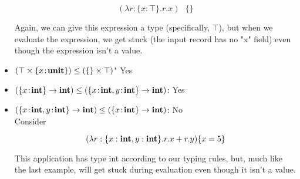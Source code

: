 \documentclass[10pt]{article}
\begin{document}
\begin{exercise}
\begin{itemize}
			$$(\lambda r:\{x:\top\}.r.x) \text{ } \{\}$$ 
			
			Again, we can give this expression a type (specifically, $\top$), but 
			when we evaluate the expression, we get stuck (the input record has no "x"
			field) even though the expression isn't a value.\\
			
\item $(\top \times \{ x \!:\! \mathsf{\textbf{unit}} \}) \leq (\{\} \times \top)$"
			Yes \\
			
			
\item $(\{ x \!:\! \mathsf{\textbf{int}} \} \rightarrow \mathsf{\textbf{int}}) \leq (\{ x \!:\! \mathsf{\textbf{int}}, y \!:\! 			\mathsf{\textbf{int}} \} \rightarrow \mathsf{\textbf{int}})$: 
			Yes \\
			
\item $(\{ x \!:\! \mathsf{\textbf{int}}, y \!:\! \mathsf{\textbf{int}} \} \rightarrow \mathsf{\textbf{int}}) \leq (\{ x \!:\! 
			\mathsf{\textbf{int}} \} \rightarrow \mathsf{\textbf{int}})$:
			No\\
			Consider 
			
			$$(\lambda r:\{x:\mathsf{\textbf{int}}, y:\mathsf{\textbf{int}}\}.r.x + r.y) \{x=5\}$$
			
			This application has type int according to our typing rules, but, much like
			the last example, will get stuck during evaluation even though it isn't a
			value.
			
\end{itemize}
\end{exercise}
\end{document}
